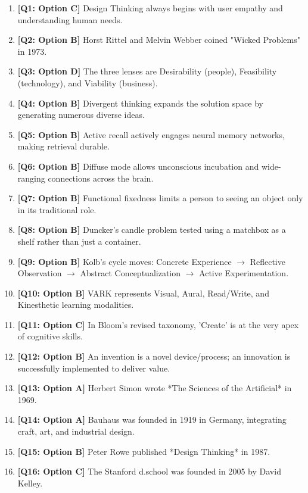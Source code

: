 \begin{expbox}
\begin{enumerate}[leftmargin=6mm, itemsep=2.5mm]
  \item \textbf{[Q1: Option C]} Design Thinking always begins with user empathy and understanding human needs.
  \item \textbf{[Q2: Option B]} Horst Rittel and Melvin Webber coined "Wicked Problems" in 1973.
  \item \textbf{[Q3: Option D]} The three lenses are Desirability (people), Feasibility (technology), and Viability (business).
  \item \textbf{[Q4: Option B]} Divergent thinking expands the solution space by generating numerous diverse ideas.
  \item \textbf{[Q5: Option B]} Active recall actively engages neural memory networks, making retrieval durable.
  \item \textbf{[Q6: Option B]} Diffuse mode allows unconscious incubation and wide-ranging connections across the brain.
  \item \textbf{[Q7: Option B]} Functional fixedness limits a person to seeing an object only in its traditional role.
  \item \textbf{[Q8: Option B]} Duncker's candle problem tested using a matchbox as a shelf rather than just a container.
  \item \textbf{[Q9: Option B]} Kolb's cycle moves: Concrete Experience $\rightarrow$ Reflective Observation $\rightarrow$ Abstract Conceptualization $\rightarrow$ Active Experimentation.
  \item \textbf{[Q10: Option B]} VARK represents Visual, Aural, Read/Write, and Kinesthetic learning modalities.
  \item \textbf{[Q11: Option C]} In Bloom's revised taxonomy, 'Create' is at the very apex of cognitive skills.
  \item \textbf{[Q12: Option B]} An invention is a novel device/process; an innovation is successfully implemented to deliver value.
  \item \textbf{[Q13: Option A]} Herbert Simon wrote *The Sciences of the Artificial* in 1969.
  \item \textbf{[Q14: Option A]} Bauhaus was founded in 1919 in Germany, integrating craft, art, and industrial design.
  \item \textbf{[Q15: Option B]} Peter Rowe published *Design Thinking* in 1987.
  \item \textbf{[Q16: Option C]} The Stanford d.school was founded in 2005 by David Kelley.

\end{enumerate}
\end{expbox}

